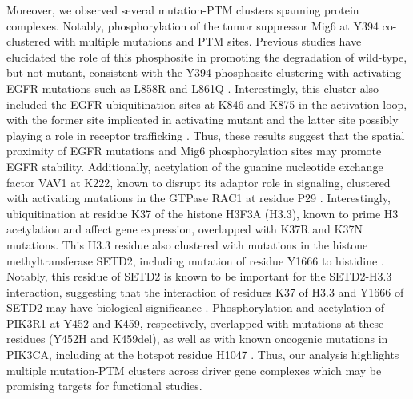 Moreover, we observed several mutation-PTM clusters spanning protein complexes.
Notably, phosphorylation of the tumor suppressor Mig6 at Y394 co-clustered with multiple  mutations and PTM sites. Previous studies have elucidated the role of this phosphosite in promoting the degradation of wild-type, but not  mutant, consistent with the Y394 phosphosite clustering with activating EGFR mutations such as L858R and L861Q \cite{gazdaraf_gazdaraf:ActivatingResistance2009,kanchark_duysterj:EpidermalGrowth2011,maitytk_guhau:LossMIG62015}. Interestingly, this cluster also included the EGFR ubiquitination sites at K846 and K875 in the activation loop, with the former site implicated in activating  mutant and the latter site possibly playing a role in receptor trafficking \cite{rayp_rayd:UbiquitinLigase2020}. Thus, these results suggest that the spatial proximity of EGFR mutations and Mig6 phosphorylation sites may promote EGFR stability. Additionally, acetylation of the guanine nucleotide exchange factor VAV1 at K222, known to disrupt its adaptor role in signaling, clustered with activating mutations in the GTPase RAC1 at residue P29 \cite{dep_deyn:RAC1Takes2019,rodriguez-fdezs_busteloxr:LysineAcetylation2020}. Interestingly, ubiquitination at residue K37 of the histone H3F3A (H3.3), known to prime H3 acetylation and affect gene expression, overlapped with K37R and K37N mutations. This H3.3 residue also clustered with mutations in the histone methyltransferase SETD2, including mutation of residue Y1666 to histidine \cite{zhangx_linhk:H3Ubiquitination2017}. Notably, this residue of SETD2 is known to be important for the SETD2-H3.3 interaction, suggesting that the interaction of residues K37 of H3.3 and Y1666 of SETD2 may have biological significance \cite{yangs_lih:MolecularBasis2016}. Phosphorylation and acetylation of PIK3R1 at Y452 and K459, respectively, overlapped with mutations at these residues (Y452H and K459del), as well as with known oncogenic mutations in PIK3CA, including at the hotspot residue H1047 \cite{vasann_baselgaj:DoublePIK3CA2019}. Thus, our analysis highlights multiple mutation-PTM clusters across driver gene complexes which may be promising targets for functional studies.

